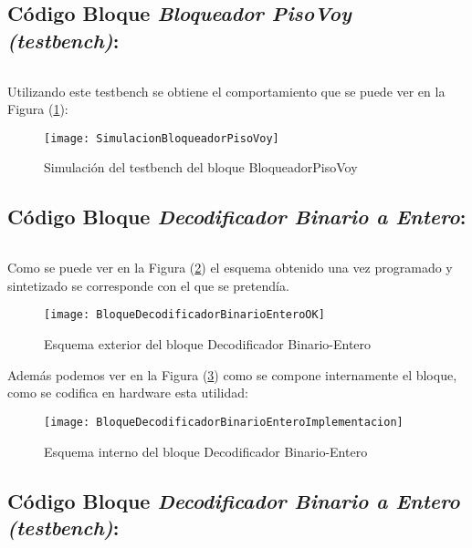 \subsection{Código Bloque \textit{Bloqueador PisoVoy (testbench)}:} \label{code:BloqueadorpisoVoy_tb}
    \inputminted[frame=lines,fontsize=\footnotesize,linenos]{vhdl}{CodeFiles/BloqueadorPisoVoy_tb.vhd}

    Utilizando este testbench se obtiene el comportamiento que se puede ver en la Figura (\ref{fig:SimulacionBloqueadorPisoVoy}):

    \begin{figure}[H]
		    \centering
		    \texttt{[image: SimulacionBloqueadorPisoVoy]}
		    \caption{Simulación del testbench del bloque BloqueadorPisoVoy}
		    \label{fig:SimulacionBloqueadorPisoVoy}
	\end{figure}

\subsection{Código Bloque \textit{Decodificador Binario a Entero}:} \label{code:DecodificadorBinarioEntero}
    \inputminted[frame=lines,fontsize=\footnotesize,linenos]{vhdl}{CodeFiles/DecodificadorBinarioEntero.vhd}
    
    Como se puede ver en la Figura (\ref{fig:BloqueDecodificadorBinarioEnteroOK}) el esquema obtenido una vez programado y sintetizado se corresponde con el que se pretendía.
    \begin{figure}[H]
		    \centering
		    \texttt{[image: BloqueDecodificadorBinarioEnteroOK]}
		    \caption{Esquema exterior del bloque Decodificador Binario-Entero}
		    \label{fig:BloqueDecodificadorBinarioEnteroOK}
	\end{figure}
    Además podemos ver en la Figura (\ref{fig:BloqueDecodificadorBinarioEnteroImplementacion}) como se compone internamente el bloque, como se codifica en hardware esta utilidad:
    \begin{figure}[H]
		    \centering
		    \texttt{[image: BloqueDecodificadorBinarioEnteroImplementacion]}
		    \caption{Esquema interno del bloque Decodificador Binario-Entero}
		    \label{fig:BloqueDecodificadorBinarioEnteroImplementacion}
	\end{figure}
    
\subsection{Código Bloque \textit{Decodificador Binario a Entero (testbench)}:} \label{code:DecodificadorBinarioEntero_tb}
    \inputminted[frame=lines,fontsize=\footnotesize,linenos]{vhdl}{CodeFiles/DecodificadorBinarioEntero_tb.vhd}

